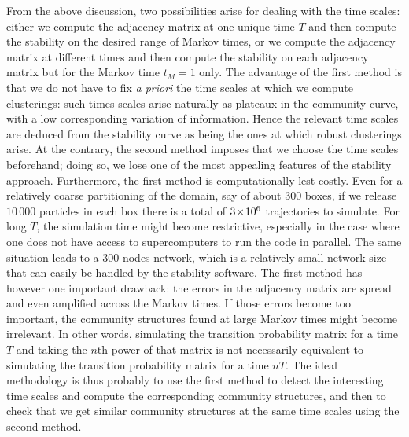 From the above discussion, two possibilities arise for dealing with the time scales: either we compute the adjacency matrix at one unique time $T$ and then compute the stability on the desired range of Markov times, or we compute the adjacency matrix at different times and then compute the stability on each adjacency matrix but for the Markov time $t_M = 1$ only. The advantage of the first method is that we do not have to fix \textit{a priori} the time scales at which we compute clusterings: such times scales arise naturally as plateaux in the community curve, with a low corresponding variation of information. Hence the relevant time scales are deduced from the stability curve as being the ones at which robust clusterings arise. At the contrary, the second method imposes that we choose the time scales beforehand; doing so, we lose one of the most appealing features of the stability approach. Furthermore, the first method is computationally lest costly. Even for a relatively coarse partitioning of the domain, say of about $300$ boxes, if we release $10\,000$ particles in each box there is a total of $3\!\times\!10^{6}$ trajectories to simulate. For long $T$, the simulation time might become restrictive, especially in the case where one does not have access to supercomputers to run the code in parallel. The same situation leads to a $300$ nodes network, which is a relatively small network size that can easily be handled by the stability software. The first method has however one important drawback: the errors in the adjacency matrix are spread and even amplified across the Markov times. If those errors become too important, the community structures found at large Markov times might become irrelevant. In other words, simulating the transition probability matrix for a time $T$ and taking the $n$th power of that matrix is not necessarily equivalent to simulating the transition probability matrix for a time $nT$. The ideal methodology is thus probably to use the first method to detect the interesting time scales and compute the corresponding community structures, and then to check that we get similar community structures at the same time scales using the second method.


